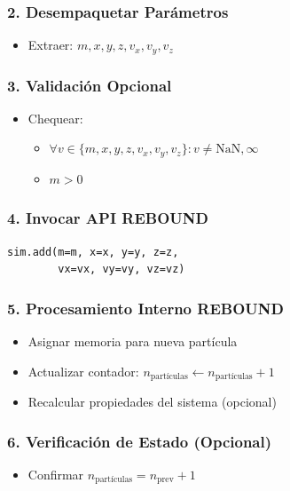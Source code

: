 \subsubsection*{2. Desempaquetar Parámetros}
\begin{itemize}
    \item Extraer: $m, x, y, z, v_x, v_y, v_z$
\end{itemize}

\subsubsection*{3. Validación Opcional}
\begin{itemize}
    \item Chequear:
    \begin{itemize}
        \item $\forall v \in \{m, x, y, z, v_x, v_y, v_z\}: v \neq \text{NaN}, \infty$
        \item $m > 0$
    \end{itemize}
\end{itemize}

\subsubsection*{4. Invocar API REBOUND}
\begin{verbatim}
sim.add(m=m, x=x, y=y, z=z,
        vx=vx, vy=vy, vz=vz)
\end{verbatim}

\subsubsection*{5. Procesamiento Interno REBOUND}
\begin{itemize}
    \item Asignar memoria para nueva partícula
    \item Actualizar contador: $n_{\text{partículas}} \leftarrow n_{\text{partículas}} + 1$
    \item Recalcular propiedades del sistema (opcional)
\end{itemize}

\subsubsection*{6. Verificación de Estado (Opcional)}
\begin{itemize}
    \item Confirmar $n_{\text{partículas}} = n_{\text{prev}} + 1$
\end{itemize}

